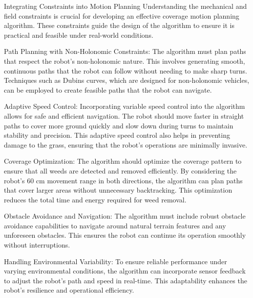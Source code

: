 Integrating Constraints into Motion Planning
Understanding the mechanical and field constraints is crucial for developing an effective coverage motion planning algorithm. These constraints guide the design of the algorithm to ensure it is practical and feasible under real-world conditions.

Path Planning with Non-Holonomic Constraints: The algorithm must plan paths that respect the robot's non-holonomic nature. This involves generating smooth, continuous paths that the robot can follow without needing to make sharp turns. Techniques such as Dubins curves, which are designed for non-holonomic vehicles, can be employed to create feasible paths that the robot can navigate.

Adaptive Speed Control: Incorporating variable speed control into the algorithm allows for safe and efficient navigation. The robot should move faster in straight paths to cover more ground quickly and slow down during turns to maintain stability and precision. This adaptive speed control also helps in preventing damage to the grass, ensuring that the robot's operations are minimally invasive.

Coverage Optimization: The algorithm should optimize the coverage pattern to ensure that all weeds are detected and removed efficiently. By considering the robot's 60 cm movement range in both directions, the algorithm can plan paths that cover larger areas without unnecessary backtracking. This optimization reduces the total time and energy required for weed removal.

Obstacle Avoidance and Navigation: The algorithm must include robust obstacle avoidance capabilities to navigate around natural terrain features and any unforeseen obstacles. This ensures the robot can continue its operation smoothly without interruptions.

Handling Environmental Variability: To ensure reliable performance under varying environmental conditions, the algorithm can incorporate sensor feedback to adjust the robot's path and speed in real-time. This adaptability enhances the robot's resilience and operational efficiency.
